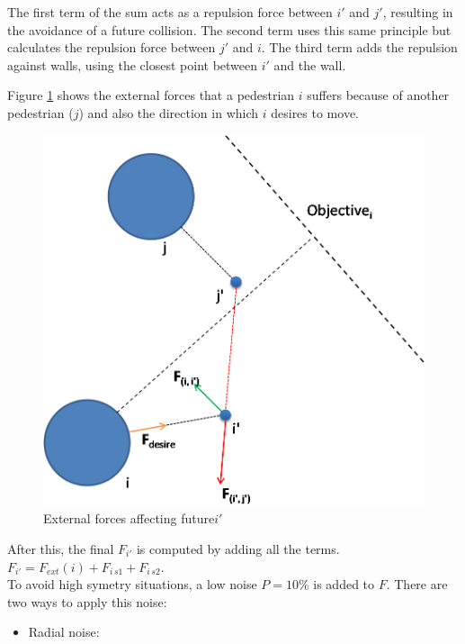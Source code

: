 \documentclass[english]{article}
\begin{document}
\begin{itemize}
\begin{itemize}
The first term of the sum acts as a repulsion force between $i'$
and $j'$, resulting in the avoidance of a future collision. The second
term uses this same principle but calculates the repulsion force between
$j'$ and $i$. The third term adds the repulsion against walls, using
the closest point between $i'$ and the wall.


Figure \ref{fig:External-forces-affecting} shows the external forces
that a pedestrian $i$ suffers because of another pedestrian ($j$)
and also the direction in which $i$ desires to move.


\begin{figure}[h]
    \centering{}
    \includegraphics[scale=0.4]{pics/pedestrian-top-forces}
    \caption{\label{fig:External-forces-affecting}External forces affecting future$i'$}
\end{figure}

\end{itemize}

After this, the final $F_{i'}$ is computed by adding all the terms.
$F_{i'}=F_{ext}(i)+F_{i\, s1}+F_{i\, s2}$.\\

To avoid high symetry situations, a low noise $P=10\%$ is added to
$F$. There are two ways to apply this noise: 
\begin{itemize}

\item Radial noise: 


\end{itemize}
\end{itemize}
\end{document}
